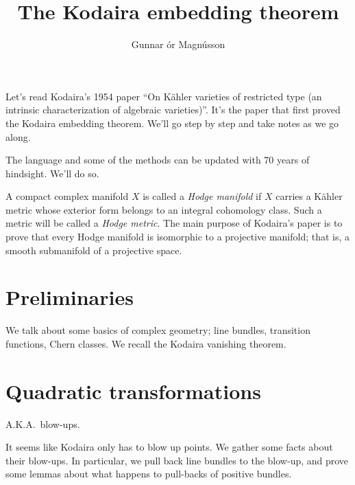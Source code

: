\documentclass{article}
\begin{document}
\title{The Kodaira embedding theorem}
\author{Gunnar \TH\'or Magn\'usson}

\maketitle

Let's read Kodaira's 1954 paper ``On K\"ahler varieties of restricted type (an intrinsic characterization of algebraic varieties)''. It's the paper that first proved the Kodaira embedding theorem. We'll go step by step and take notes as we go along.

The language and some of the methods can be updated with 70 years of hindsight. We'll do so.

A compact complex manifold $X$ is called a \emph{Hodge manifold} if $X$ carries a K\"ahler metric whose exterior form belongs to an integral cohomology class. Such a metric will be called a \emph{Hodge metric}. The main purpose of Kodaira's paper is to prove that every Hodge manifold is isomorphic to a projective manifold; that is, a smooth submanifold of a projective space.


\section{Preliminaries}

We talk about some basics of complex geometry; line bundles, transition functions, Chern classes. We recall the Kodaira vanishing theorem.

\section{Quadratic transformations}

A.K.A.~blow-ups.

It seems like Kodaira only has to blow up points. We gather some facts about their blow-ups. In particular, we pull back line bundles to the blow-up, and prove some lemmas about what happens to pull-backs of positive bundles.
\end{document}
